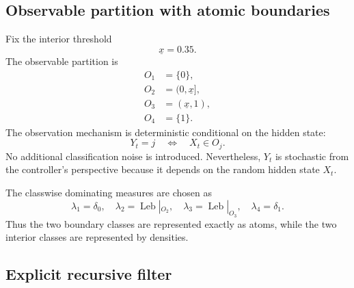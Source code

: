 \documentclass[10pt,twocolumn]{article}
\theoremstyle{remark}
\begin{document}
\subsection{Observable partition with atomic boundaries}
\label{subsec:reference-observable-partition}

Fix the interior threshold
\begin{equation*}
	\underline x=0.35.
	\label{eq:reference-threshold}
\end{equation*}
The observable partition is
\begin{equation*}
	\begin{aligned}
		O_1&=\{0\},\\
		O_2&=(0,\underline x],\\
		O_3&=(\underline x,1),\\
		O_4&=\{1\}.
	\end{aligned}
	\label{eq:reference-observable-classes}
\end{equation*}
The observation mechanism is deterministic conditional on the hidden state:
\begin{equation}
	Y_t=j
	\quad\Longleftrightarrow\quad
	X_t\in O_j.
	\label{eq:reference-observation-mechanism}
\end{equation}
No additional classification noise is introduced. Nevertheless, \(Y_t\) is stochastic from the controller's perspective because it depends on the random hidden state \(X_t\).

The classwise dominating measures are chosen as
\begin{equation*}
	\lambda_1=\delta_0,
	\quad
	\lambda_2=\operatorname{Leb}|_{O_2},
	\quad
	\lambda_3=\operatorname{Leb}|_{O_3},
	\quad
	\lambda_4=\delta_1.
	\label{eq:reference-dominating-measures}
\end{equation*}
Thus the two boundary classes are represented exactly as atoms, while the two interior classes are represented by densities.

\subsection{Explicit recursive filter}
\label{subsec:reference-explicit-filter}
\end{document}
